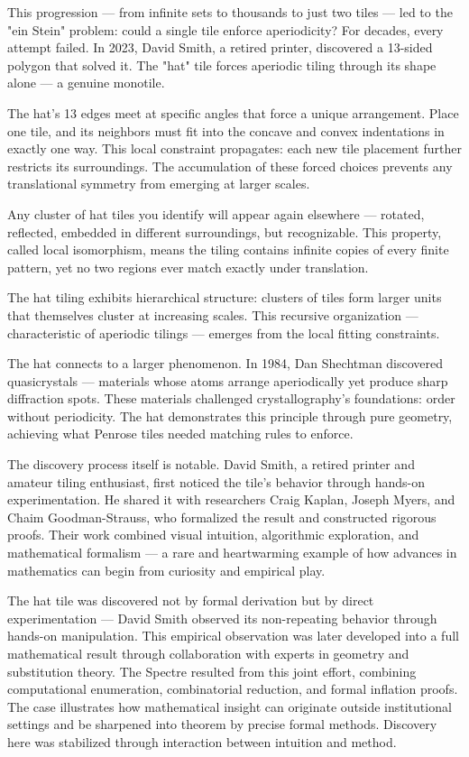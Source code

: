 This progression — from infinite sets to thousands to just two tiles — led to the "ein Stein" problem: could a single tile enforce aperiodicity? For decades, every attempt failed. In 2023, David Smith, a retired printer, discovered a 13-sided polygon that solved it. The "hat" tile forces aperiodic tiling through its shape alone — a genuine monotile.

The hat's 13 edges meet at specific angles that force a unique arrangement. Place one tile, and its neighbors must fit into the concave and convex indentations in exactly one way. This local constraint propagates: each new tile placement further restricts its surroundings. The accumulation of these forced choices prevents any translational symmetry from emerging at larger scales.

Any cluster of hat tiles you identify will appear again elsewhere — rotated, reflected, embedded in different surroundings, but recognizable. This property, called local isomorphism, means the tiling contains infinite copies of every finite pattern, yet no two regions ever match exactly under translation.

The hat tiling exhibits hierarchical structure: clusters of tiles form larger units that themselves cluster at increasing scales. This recursive organization — characteristic of aperiodic tilings — emerges from the local fitting constraints.

The hat connects to a larger phenomenon. In 1984, Dan Shechtman discovered quasicrystals — materials whose atoms arrange aperiodically yet produce sharp diffraction spots. These materials challenged crystallography's foundations: order without periodicity. The hat demonstrates this principle through pure geometry, achieving what Penrose tiles needed matching rules to enforce.

The discovery process itself is notable. David Smith, a retired printer and amateur tiling enthusiast, first noticed the tile’s behavior through hands-on experimentation. He shared it with researchers Craig Kaplan, Joseph Myers, and Chaim Goodman-Strauss, who formalized the result and constructed rigorous proofs. Their work combined visual intuition, algorithmic exploration, and mathematical formalism — a rare and heartwarming example of how advances in mathematics can begin from curiosity and empirical play.

\clearpage

\begin{commentary}
The hat tile was discovered not by formal derivation but by direct experimentation — David Smith observed its non-repeating behavior through hands-on manipulation. This empirical observation was later developed into a full mathematical result through collaboration with experts in geometry and substitution theory. The Spectre resulted from this joint effort, combining computational enumeration, combinatorial reduction, and formal inflation proofs. The case illustrates how mathematical insight can originate outside institutional settings and be sharpened into theorem by precise formal methods. Discovery here was stabilized through interaction between intuition and method.
\end{commentary}

